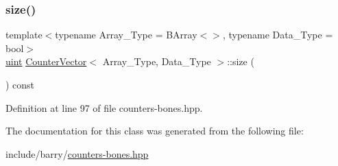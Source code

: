 \subsubsection{\texorpdfstring{size()}{size()}}
{\footnotesize\ttfamily template$<$typename Array\+\_\+\+Type = B\+Array$<$$>$, typename Data\+\_\+\+Type = bool$>$ \\
\hyperlink{typedefs_8hpp_a91ad9478d81a7aaf2593e8d9c3d06a14}{uint} \hyperlink{class_counter_vector}{Counter\+Vector}$<$ Array\+\_\+\+Type, Data\+\_\+\+Type $>$\+::size (\begin{DoxyParamCaption}{ }\end{DoxyParamCaption}) const\hspace{0.3cm}{\ttfamily [inline]}}



Definition at line 97 of file counters-\/bones.\+hpp.



The documentation for this class was generated from the following file\+:\begin{DoxyCompactItemize}
\item 
include/barry/\hyperlink{counters-bones_8hpp}{counters-\/bones.\+hpp}\end{DoxyCompactItemize}
